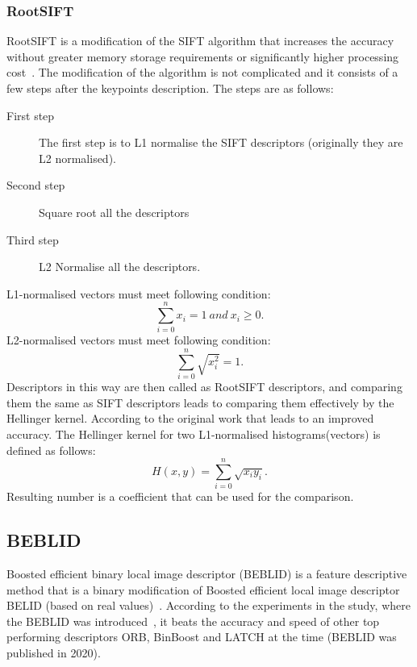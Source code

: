 \documentclass[thesis=B,english]{FITthesis}[2019/12/23]
\begin{document}
        \subsubsection*{RootSIFT}
            RootSIFT is a modification of the SIFT algorithm that increases the accuracy without greater memory storage requirements or significantly higher processing cost~\cite{arandjelovic2012three}. The modification of the algorithm is not complicated and it consists of a few steps after the keypoints description. The steps are as follows:
            \begin{description}
                \item[First step] The first step is to L1 normalise the SIFT descriptors (originally they are L2 normalised).
                \item[Second step] Square root all the descriptors
                \item[Third step] L2 Normalise all the descriptors.
            \end{description}
            L1-normalised vectors must meet following condition:
            \begin{equation}
                \sum_{i=0}^{n} x_i = 1 \ and  \ x_i \geq 0 .
            \end{equation}
            L2-normalised vectors must meet following condition:
            \begin{equation}
                \sum_{i=0}^{n} \sqrt{x_i^2} = 1.
            \end{equation}
            Descriptors in this way are then called as RootSIFT descriptors, and comparing them the same as SIFT descriptors leads to comparing them effectively by the Hellinger kernel. According to the original work that leads to an improved accuracy. The Hellinger kernel for two L1-normalised histograms(vectors) is defined as follows:
            \begin{equation}
                H(x, y) = \sum_{i=0}^{n} \sqrt{x_i y_i}.
            \end{equation}
            Resulting number is a coefficient that can be used for the comparison.
                
        \subsection{BEBLID}
            Boosted efficient binary local image descriptor (BEBLID) is a feature descriptive method that is a binary modification of Boosted efficient local image descriptor BELID (based on real values)~\cite{SUAREZ2020_paper}. According to the experiments in the study, where the BEBLID was introduced~\cite{SUAREZ2020_paper}, it beats the accuracy and speed of other top performing descriptors ORB, BinBoost and LATCH at the time (BEBLID was published in 2020).  
            
\end{document}
